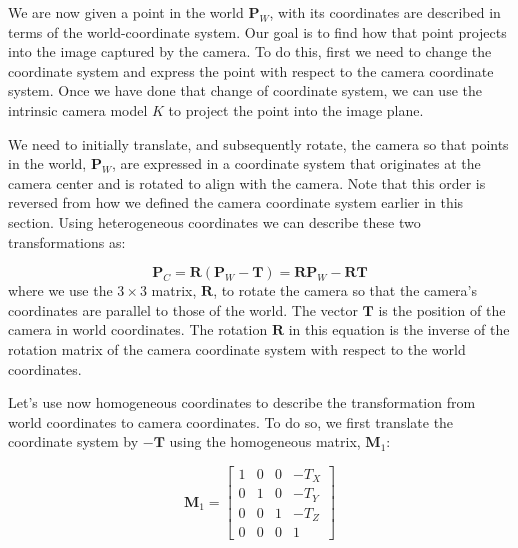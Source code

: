We are now given a point in the world $\mathbf{P}_W$, with its coordinates are described in terms of the world-coordinate system. Our goal is to find how that point projects into the image captured by the camera. To do this, first we need to change the coordinate system and express the point with respect to the camera coordinate system. Once we have done that change of coordinate system, we can use the intrinsic camera model $K$ to project the point into the image plane.  






We need to initially translate, and subsequently rotate, the camera so that points in the world, $\mathbf{P}_W$, are expressed in a coordinate system that originates at the camera center and is rotated to align with the camera. Note that this order is reversed from how we defined the camera coordinate system earlier in this section. Using heterogeneous coordinates we can describe these two transformations as:

\begin{equation}
\mathbf{P}_C = \mathbf{R} (\mathbf{P}_W  - \mathbf{T}) = \mathbf{R} \mathbf{P}_W  -  \mathbf{R}\mathbf{T}
\end{equation}
where we use the $3\times3$ matrix, $\mathbf{R}$, to rotate the camera so that the camera's coordinates are parallel to those of the world. The vector $\mathbf{T}$ is the position of the camera in world coordinates. The rotation $\mathbf{R}$ in this equation is the inverse of the rotation matrix of the camera coordinate system with respect to the world coordinates.




Let's use now homogeneous coordinates to describe the transformation from world coordinates to camera coordinates. To do so, we first translate the coordinate system by $-\mathbf{T}$ using the homogeneous matrix, $\mathbf{M}_1$:

\begin{equation}
\mathbf{M}_1 =         
    \begin{bmatrix}
    1 & 0 & 0 & -T_X \\
    0 & 1 & 0 & -T_Y \\
    0 & 0 & 1 & -T_Z \\
    0 & 0 & 0 & 1
    \end{bmatrix}
\end{equation}

